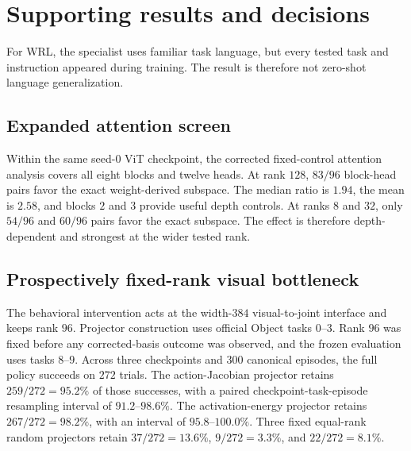 \documentclass{article}
\begin{document}
\appendix
\renewcommand{\theHfigure}{A.\arabic{figure}}
\raggedbottom
\section{Supporting results and decisions}





For WRL, the specialist uses familiar task language, but every tested task and instruction appeared
during training. The result is therefore not zero-shot language generalization.

\subsection{Expanded attention screen}
\label{app:expanded-mechanisms}

Within the same seed-$0$ ViT checkpoint, the corrected fixed-control attention analysis covers
all eight blocks and twelve heads. At
rank $128$, $83/96$ block-head pairs favor the exact weight-derived subspace. The median ratio
is $1.94$, the mean is $2.58$, and blocks $2$ and $3$ provide useful depth controls.
At ranks $8$ and $32$, only $54/96$ and $60/96$ pairs favor the exact subspace. The effect is
therefore depth-dependent and strongest at the wider tested rank.

\subsection{Prospectively fixed-rank visual bottleneck}
\label{app:visual-bottleneck}

The behavioral intervention acts at the width-$384$ visual-to-joint interface and keeps rank
$96$. Projector construction uses official Object tasks $0$--$3$. Rank $96$ was fixed before any
corrected-basis outcome was observed, and the frozen evaluation uses tasks $8$--$9$. Across three checkpoints and $300$
canonical episodes, the full policy succeeds on $272$ trials. The action-Jacobian projector
retains $259/272=95.2\%$ of those successes, with a paired checkpoint-task-episode resampling
interval of $91.2$--$98.6\%$. The activation-energy projector retains $267/272=98.2\%$, with an
interval of $95.8$--$100.0\%$. Three fixed equal-rank random projectors retain $37/272=13.6\%$,
$9/272=3.3\%$, and $22/272=8.1\%$.
\end{document}
